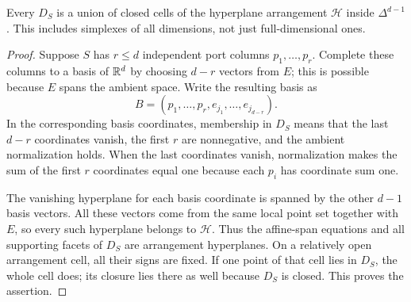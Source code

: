 \begin{lemma}
\label{lem:frame}
Every $D_S$ is a union of closed cells of the hyperplane arrangement $\mathcal H$ inside $\Delta^{d-1}$. This includes simplexes of all dimensions, not just full-dimensional ones.
\end{lemma}
\begin{proof}
Suppose $S$ has $r\le d$ independent port columns $p_1,\ldots,p_r$. Complete these columns to a basis of $\mathbb R^d$ by choosing $d-r$ vectors from $E$; this is possible because $E$ spans the ambient space. Write the resulting basis as
\[
 B=(p_1,\ldots,p_r,e_{j_1},\ldots,e_{j_{d-r}}).
\]
In the corresponding basis coordinates, membership in $D_S$ means that the last $d-r$ coordinates vanish, the first $r$ are nonnegative, and the ambient normalization holds. When the last coordinates vanish, normalization makes the sum of the first $r$ coordinates equal one because each $p_i$ has coordinate sum one.

The vanishing hyperplane for each basis coordinate is spanned by the other $d-1$ basis vectors. All these vectors come from the same local point set together with $E$, so every such hyperplane belongs to $\mathcal H$. Thus the affine-span equations and all supporting facets of $D_S$ are arrangement hyperplanes. On a relatively open arrangement cell, all their signs are fixed. If one point of that cell lies in $D_S$, the whole cell does; its closure lies there as well because $D_S$ is closed. This proves the assertion.
\end{proof}


